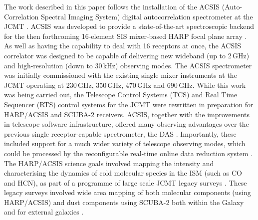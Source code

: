 \documentclass[useAMS,usenatbib]{mn2e}
\begin{document}
The work described in this paper follows the installation of the ACSIS
(Auto-Correlation Spectral Imaging System) digital autocorrelation
spectrometer at the JCMT \citep{2009MNRAS.399.1026B}. ACSIS was
developed to provide a state-of-the-art spectroscopic backend for the
then forthcoming 16-element SIS mixer-based HARP focal plane array \citep{2003SPIE.4855..338S}. As
well as having the capability to deal with 16 receptors at once, the
ACSIS correlator was designed to be capable of delivering new wideband
(up to 2\,GHz) and high-resolution (down to 30\,kHz) observing
modes. The ACSIS spectrometer was initially commissioned with the
existing single mixer instruments at the JCMT operating at 230\,GHz,
350\,GHz, 470\,GHz and 690\,GHz. While this work was being carried
out, the Telescope Control Systems (TCS) and Real Time Sequencer (RTS)
control systems \citep{2002SPIE.4848..283R} for the JCMT were
rewritten in preparation for HARP/ACSIS and SCUBA-2 receivers. ACSIS,
together with the improvements in telescope software infrastructure,
offered many observing advantages over the previous single
receptor-capable spectrometer, the DAS \citep[Dutch Autocorrelation
Spectrometer;][]{1986SPIE..598..134B}. Importantly, these included
support for a much wider variety of telescope observing modes, which
could be processed by the reconfigurable real-time online data reduction
system \citep{2000ASPC..216..502L}. The HARP/ACSIS
science goals involved mapping the intensity and characterising the
dynamics of cold molecular species in the ISM (such as CO and HCN), as
part of a programme of large scale JCMT legacy surveys
\citep{2010HiA....15..797C}. These legacy surveys involved wide area
mapping of both molecular components (using HARP/ACSIS) and dust
components using SCUBA-2 \citep{2013MNRAS.430.2513H} both within the
Galaxy \citep{2007PASP..119..855W} and for external galaxies
\citep{2009ApJ...693.1736W}.
\end{document}
